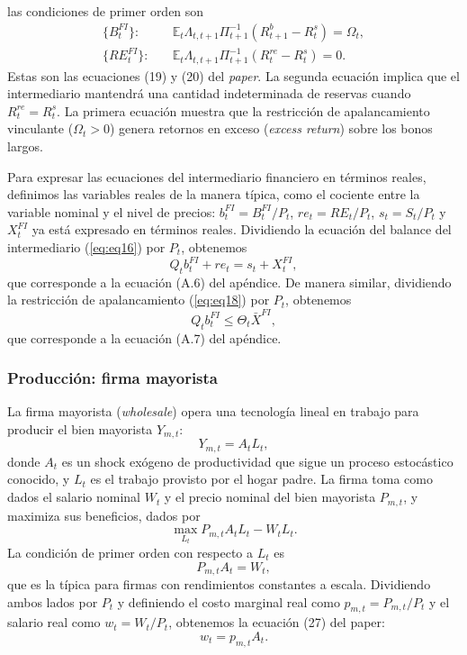 \documentclass[../../entrega.tex]{subfiles}
\begin{document}
las condiciones de primer orden son
\begin{align}
    \{B_t^{FI}\}:  & \quad \mathbb{E}_t \Lambda_{t,t+1} \Pi_{t+1}^{-1}(R_{t+1}^b - R_t^s) = \Omega_t, \\
    \{RE_t^{FI}\}: & \quad \mathbb{E}_t \Lambda_{t,t+1} \Pi_{t+1}^{-1}(R_t^{re} - R_t^s) = 0.
\end{align}
Estas son las ecuaciones (19) y (20) del \emph{paper}.
La segunda ecuación implica que el intermediario mantendrá una cantidad indeterminada de reservas cuando $R_t^{re} = R_t^s$.
La primera ecuación muestra que la restricción de apalancamiento vinculante ($\Omega_t > 0$) genera retornos en exceso (\emph{excess return}) sobre los bonos largos.

Para expresar las ecuaciones del intermediario financiero en términos reales, definimos las variables reales de la manera típica, como el cociente entre la variable nominal y el nivel de precios: $b_t^{FI} = B_t^{FI}/P_t$, $re_t = RE_t/P_t$, $s_t = S_t/P_t$ y $X_t^{FI}$ ya está expresado en términos reales.
Dividiendo la ecuación del balance del intermediario (\ref{eq:eq16}) por $P_t$, obtenemos
\begin{equation}
    Q_t b_t^{FI} + re_t = s_t + X_t^{FI},
\end{equation}
que corresponde a la ecuación (A.6) del apéndice.
De manera similar, dividiendo la restricción de apalancamiento (\ref{eq:eq18}) por $P_t$, obtenemos
\begin{equation}
    Q_t b_t^{FI} \leq \Theta_t \bar{X}^{FI},
\end{equation}
que corresponde a la ecuación (A.7) del apéndice.

\subsubsection{Producción: firma mayorista}
La firma mayorista (\emph{wholesale}) opera una tecnología lineal en trabajo para producir el bien mayorista $Y_{m,t}$:
\begin{equation}
    Y_{m,t} = A_t L_t,
\end{equation}
donde $A_t$ es un shock exógeno de productividad que sigue un proceso estocástico conocido, y $L_t$ es el trabajo provisto por el hogar padre.
La firma toma como dados el salario nominal $W_t$ y el precio nominal del bien mayorista $P_{m,t}$, y maximiza sus beneficios, dados por
\begin{equation*}
    \max_{L_t} P_{m,t}A_t L_t - W_t L_t.
\end{equation*}
La condición de primer orden con respecto a $L_t$ es
\begin{equation*}
    P_{m,t}A_t = W_t,
\end{equation*}
que es la típica para firmas con rendimientos constantes a escala.
Dividiendo ambos lados por $P_t$ y definiendo el costo marginal real como $p_{m,t} = P_{m,t}/P_t$ y el salario real como $w_t = W_t/P_t$, obtenemos la ecuación (27) del paper:
\begin{equation}
    w_t = p_{m,t}A_t.
\end{equation}
\end{document}
